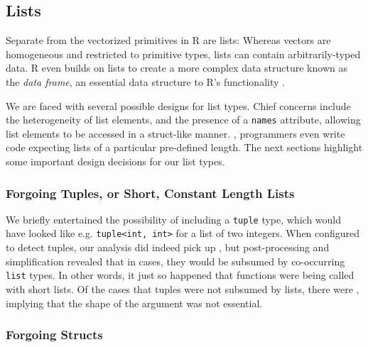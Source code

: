 \documentclass[acmsmall,review,anonymous]{acmart}\settopmatter{printfolios=true,printccs=false,printacmref=false}
\newcommand{\code}[1]{{\lstinline[style=Rin]!#1!}\xspace}
\begin{document}
%
%
%
%
\subsection{Lists}

Separate from the vectorized primitives in R are lists:
Whereas vectors are homogeneous and restricted to primitive types, lists can contain arbitrarily-typed data.
R even builds on lists to create a more complex data structure known as the {\it data frame}, an essential data structure to R's functionality .

We are faced with several possible designs for list types.
Chief concerns include the heterogeneity of list elements, and the presence of a \code{names} attribute, allowing list elements to be accessed in a struct-like manner.
, programmers even write code expecting lists of a particular pre-defined length.
The next sections highlight some important design decisions for our list types.


%
%
\subsubsection{Forgoing Tuples, or Short, Constant Length Lists}

We briefly entertained the possibility of including a \code{tuple} type, which would have looked like e.g. \code{tuple<int, int>} for a list of two integers.
When configured to detect tuples, our analysis did indeed pick up , but post-processing and simplification revealed that in  cases, they would be subsumed by co-occurring \code{list} types.
In other words, it just so happened that functions were being called with short lists.
Of the cases that tuples were not subsumed by lists,  there were , implying that the shape of the argument was not essential.

%
%
\subsubsection{Forgoing Structs}
\end{document}
